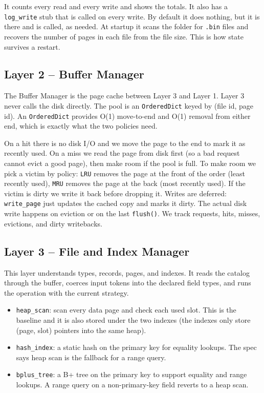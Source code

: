 \documentclass[12pt]{article}
\begin{document}
It counts every read and every write and shows the totals. It also has a
\texttt{log\_write} stub that is called on every write. By default it does
nothing, but it is there and is called, as needed. At startup it scans the
folder for \texttt{.bin} files and recovers the number of pages in each file from the
file size. This is how state survives a restart.

\subsection{Layer 2 -- Buffer Manager}

The Buffer Manager is the page cache between Layer 3 and Layer 1. Layer 3
never calls the disk directly. The pool is an \texttt{OrderedDict} keyed by
(file id, page id). An \texttt{OrderedDict} provides O(1) move-to-end and
O(1) removal from either end, which is exactly what the two policies need.

On a hit there is no disk I/O and we move the page to the end to mark it as
recently used. On a miss we read the page from disk first (so a bad request
cannot evict a good page), then make room if the pool is full. To make
room we pick a victim by policy: \texttt{LRU} removes the page at the front
of the order (least recently used), \texttt{MRU} removes the page at the
back (most recently used). If the victim is dirty we write it back before
dropping it. Writes are deferred: \texttt{write\_page} just updates the
cached copy and marks it dirty. The actual disk write happens on eviction or
on the last \texttt{flush()}. We track requests, hits, misses, evictions,
and dirty writebacks.

\subsection{Layer 3 -- File and Index Manager}

This layer understands types, records, pages, and indexes. It reads the
catalog through the buffer, coerces input tokens into the declared field
types, and runs the operation with the current strategy.

\begin{itemize}[noitemsep]
  \item \texttt{heap\_scan}: scan every data page and check each used
        slot. This is the baseline and it is also stored under the two indexes
        (the indexes only store (page, slot) pointers into the same heap).
  \item \texttt{hash\_index}: a static hash on the primary key for equality
        lookups. The spec says heap scan is the fallback for a range query.
  \item \texttt{bplus\_tree}: a B+ tree on the primary key to support
        equality and range lookups. A range query on a non-primary-key
        field reverts to a heap scan.
\end{itemize}
\end{document}
